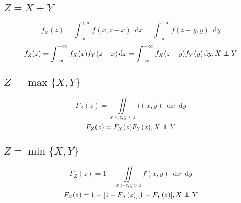 \documentclass[]{article}
\newcommand*{\dif}{\mathop{}\!\mathrm{d}}
\numberwithin{equation}{section}
\newcommand\independent{\protect\mathpalette{\protect\independenT}{\perp}}
\def\independenT#1#2{\mathrel{\rlap{$#1#2$}\mkern2mu{#1#2}}}
\begin{document}
\subsection{$Z=X+Y$}
\begin{equation}
    f_Z(z)=\int_{-\infty}^{+\infty}f(x,z-x)\dif x=\int_{-\infty}^{+\infty}f(z-y,y)\dif y
\end{equation}
\begin{equation}
    f_Z(z)=\int_{-\infty}^{+\infty}f_X(x)f_Y(z-x)\dif x=\int_{-\infty}^{+\infty}f_X(z-y)f_Y(y)\dif y,X\independent Y
\end{equation}
\subsection{$Z=\max\{X,Y\}$}
\begin{equation}
    F_Z(z)=\iint\limits_{x\le z,y\le z}f(x,y)\dif x\dif y
\end{equation}
\begin{equation}
    F_Z(z)=F_X(z)F_Y(z),X\independent Y
\end{equation}
\subsection{$Z=\min\{X,Y\}$}
\begin{equation}
    F_Z(z)=1-\iint\limits_{x> z,y> z}f(x,y)\dif x\dif y
\end{equation}
\begin{equation}
    F_Z(z)=1-[1-F_X(z)][1-F_Y(z)],X\independent Y
\end{equation}
\end{document}
